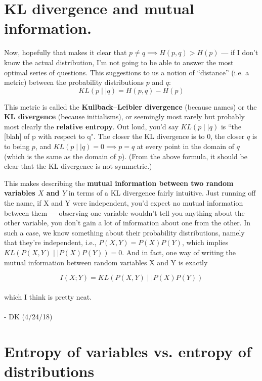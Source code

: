 \documentclass[letterpaper,12pt]{report}
\begin{document}
\section{KL divergence and mutual information.}\label{kl-divergence-and-mutual-information}


Now, hopefully that makes it clear that \( p \neq q \implies H(p,q)
> H(p) \) --- if I don't know the actual distribution, I'm
not going to be able to answer the most optimal series of questions.
This suggestions to us a notion of ``distance'' (i.e. a metric) between
the probability distributions \(p\) and \(q\):
\[ KL(p \mid\mid q) = H(p,q) - H(p) \]

This metric is called the \textbf{Kullback--Leibler divergence}
 
(because
names) or the \textbf{KL divergence} (because initialisms), or seemingly
most rarely but probably most clearly the \textbf{relative entropy}. Out
loud, you'd say \(KL(p \mid\mid q)\) is ``the {[}blah{]} of p with
respect to q". The closer the KL divergence is to 0, the closer \(q\) is
to being \(p\), and \( KL(p \mid\mid q) = 0 \implies p = q \) at every
point in the domain of \(q\) (which is the same as the domain of \(p\)). 
(From the above formula, 
it should be clear that the KL divergence is not symmetric.)

This makes describing the
\textbf{mutual information between two random variables \(X\) and \(Y\)}
in terms of a KL divergence fairly intuitive. Just
running off the name, if X and Y were independent, you'd expect no
mutual information between them --- 
observing one variable wouldn't tell you anything about the other variable, you don't gain
a lot of information about one from the other. 
In such a case, we know something about their probability distributions,
namely that they're independent, i.e., \(P(X,Y) = P(X)P(Y)\), which implies 
\( KL\left(P(X,Y)\mid\mid P(X)P(Y)\right) = 0\). 
And in fact, one way of writing the mutual information 
between random variables X and Y is exactly

\[ I(X;Y) = KL\left(P(X,Y)\mid\mid P(X)P(Y)\right) \]
\\
which I think is pretty neat.
\\
\\
- DK (4/24/18)

\section{Entropy of variables vs. entropy of distributions}\label{entropy-of-variables-vs-entropy-of-distributions}
\end{document}
